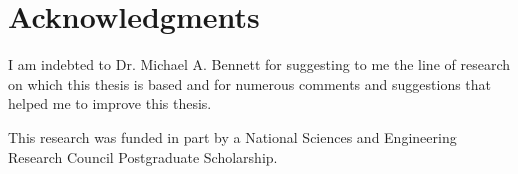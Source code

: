 
\chapter{Acknowledgments}

I am indebted to Dr. Michael A. Bennett for suggesting to me the line of research on which this thesis is based and for numerous comments and suggestions that helped me to improve this thesis. 

This research was funded in part by a National Sciences and Engineering Research Council Postgraduate Scholarship.

\endinput

Thank those people who helped you. 

Don't forget your parents or loved ones.

You may wish to acknowledge your funding sources.
